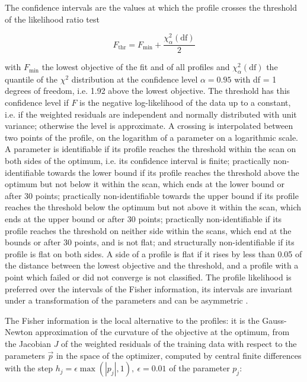 \documentclass{article}
\begin{document}
The confidence intervals are the values at which the profile crosses the threshold of the likelihood ratio test

\begin{equation}
F_{\mathrm{thr}} = F_{\min} + \frac{\chi^2_{\alpha}(\mathrm{df})}{2}
\end{equation}

with $F_{\min}$ the lowest objective of the fit and of all profiles and $\chi^2_{\alpha}(\mathrm{df})$ the quantile of the $\chi^2$ distribution at the confidence level $\alpha = 0.95$ with df = 1 degrees of freedom, i.e. 1.92 above the lowest objective. The threshold has this confidence level if $F$ is the negative log-likelihood of the data up to a constant, i.e. if the weighted residuals are independent and normally distributed with unit variance; otherwise the level is approximate. A crossing is interpolated between two points of the profile, on the logarithm of a parameter on a logarithmic scale. A parameter is identifiable if its profile reaches the threshold within the scan on both sides of the optimum, i.e. its confidence interval is finite; practically non-identifiable towards the lower bound if its profile reaches the threshold above the optimum but not below it within the scan, which ends at the lower bound or after 30 points; practically non-identifiable towards the upper bound if its profile reaches the threshold below the optimum but not above it within the scan, which ends at the upper bound or after 30 points; practically non-identifiable if its profile reaches the threshold on neither side within the scans, which end at the bounds or after 30 points, and is not flat; and structurally non-identifiable if its profile is flat on both sides. A side of a profile is flat if it rises by less than 0.05 of the distance between the lowest objective and the threshold, and a profile with a point which failed or did not converge is not classified. The profile likelihood is preferred over the intervals of the Fisher information, its intervals are invariant under a transformation of the parameters and can be asymmetric \cite{Wieland2021}.

The Fisher information is the local alternative to the profiles: it is the Gauss-Newton approximation of the curvature of the objective at the optimum, from the Jacobian $J$ of the weighted residuals of the training data with respect to the parameters $\vec{p}$ in the space of the optimizer, computed by central finite differences with the step $h_j = \epsilon \max(|p_j|, 1),\ \epsilon = 0.01$ of the parameter $p_j$:
\end{document}
